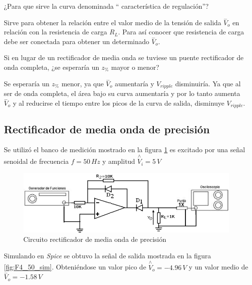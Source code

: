 \documentclass[10pt,spanish,a4paper,openany,notitlepage]{article}
\begin{document}
{\color{OliveGreen} ¿Para que sirve la curva denominada \textquotedblleft
característica de regulación\textquotedblright?}

Sirve para obtener la relación entre el valor medio de la tensión de salida
$\overset{-}{V}_{o}$ en relación con la resistencia de carga $R_L$. Para
así conocer que resistencia de carga debe ser conectada para obtener
un determinado $\overset{-}{V}_{o}$.

{\color{Orange} Si en lugar de un rectificador de media onda se tuviese un puente rectificador de onda completa, ¿se esperaría un $z_{\%}$ mayor o menor?}

Se esperaría un $z_{\%}$ menor, ya que $\overset{-}{V}_{o}$ aumentaría
y $V_{ripple}$ disminuiría. Ya que al ser de onda completa, el área bajo su curva aumentaría y por lo tanto aumenta $\overset{-}{V}_{o}$ y al reducirse el tiempo entre los picos de la curva de salida, disminuye $V_{ripple}$.


\subsection{Rectificador de media onda de precisión}

Se utilizó el banco de medición mostrado en la figura \ref{fig:4_circuito} es excitado por una señal senoidal de frecuencia $f = 50\,\unit{Hz}$ y amplitud $\overset{\wedge}{V}_{i} = 5\,\unit{V}$


\begin{figure}[H]
\centering
\includegraphics[scale=0.7]{circuitos/Fprecision.png}
\caption{Circuito rectificador de media onda de precisión}
\label{fig:4_circuito}
\end{figure}


Simulando en \emph{Spice} se obtuvo la señal de salida mostrada en la figura 
\ref{fig:F4_50_sim}. Obteniéndose un valor pico de $ \overset{\wedge}{V}_{o} = -4.96\,\unit{V} $ 
y un valor medio de $\overset{-}{V}_{o} = -1.58\,\unit{V}$
\end{document}
